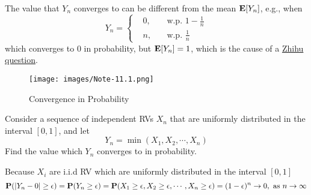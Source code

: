 \begin{remark}
    The value that $Y_n$ converges to can be different from the mean $\mathbf{E}[Y_n]$, e.g., when 
    \begin{equation}
        Y_n = \left\{\begin{aligned}
            &0, \quad &\text{w.p. } 1 - \frac{1}{n} \\
            &n, \quad &\text{w.p. } \frac{1}{n}
        \end{aligned}\right.
    \end{equation}
    which converges to $0$ in probability, but $\mathbf{E}[Y_n] = 1$, which is the cause of a \href{https://www.zhihu.com/question/570330301/answer/2789083568}{Zhihu question}.
\end{remark}
\begin{figure}[H]
    \centering
    \texttt{[image: images/Note-11.1.png]}
    \caption{Convergence in Probability}
    \label{fig:convergence_in_probability}
\end{figure}
\begin{example}
    Consider a sequence of independent RVs $X_n$ that are uniformly distributed in the interval $[0, 1]$, and let
    \begin{equation}
        Y_n = \min(X_1, X_2, \cdots, X_n)
    \end{equation}
    Find the value which $Y_n$ converges to in probability.
\end{example}
\begin{solution}
    Because $X_i$ are i.i.d RV which are uniformly distributed in the interval $[0, 1]$
    \begin{equation}
        \mathbf{P}(\abs{Y_n - 0} \geq \epsilon) = \mathbf{P}(Y_n \geq \epsilon) = \mathbf{P}(X_1 \geq \epsilon, X_2 \geq \epsilon, \cdots, X_n \geq \epsilon) = (1 - \epsilon)^n \to 0, \text{ as } n \to \infty
    \end{equation}
\end{solution}


